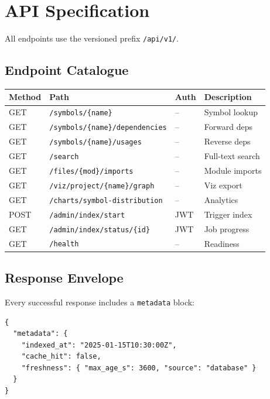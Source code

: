 \chapter{API Specification}

All endpoints use the versioned prefix \texttt{/api/v1/}.

\section{Endpoint Catalogue}

\begin{longtable}{@{}llll@{}}
\toprule
\textbf{Method} & \textbf{Path} & \textbf{Auth} & \textbf{Description} \\
\midrule
\endhead
GET  & \texttt{/symbols/\{name\}}              & --  & Symbol lookup \\
GET  & \texttt{/symbols/\{name\}/dependencies}  & --  & Forward deps \\
GET  & \texttt{/symbols/\{name\}/usages}         & --  & Reverse deps \\
GET  & \texttt{/search}                          & --  & Full-text search \\
GET  & \texttt{/files/\{mod\}/imports}           & --  & Module imports \\
GET  & \texttt{/viz/project/\{name\}/graph}      & --  & Viz export \\
GET  & \texttt{/charts/symbol-distribution}      & --  & Analytics \\
POST & \texttt{/admin/index/start}               & JWT & Trigger index \\
GET  & \texttt{/admin/index/status/\{id\}}       & JWT & Job progress \\
GET  & \texttt{/health}                          & --  & Readiness \\
\bottomrule
\end{longtable}

\section{Response Envelope}

Every successful response includes a \texttt{metadata} block:

\begin{lstlisting}[language={}]
{
  "metadata": {
    "indexed_at": "2025-01-15T10:30:00Z",
    "cache_hit": false,
    "freshness": { "max_age_s": 3600, "source": "database" }
  }
}
\end{lstlisting}

